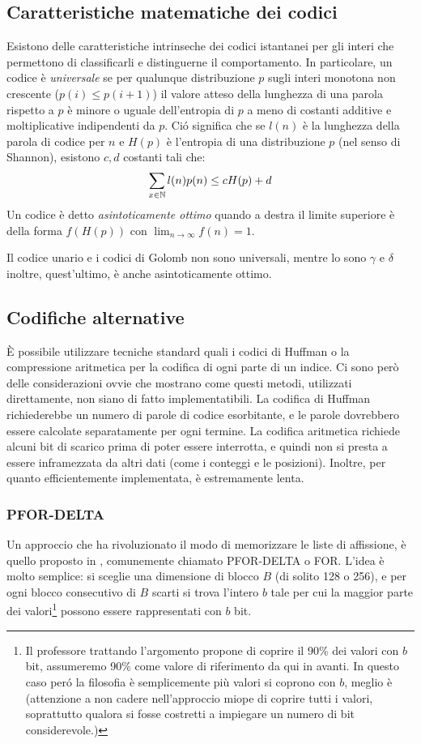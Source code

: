 \subsection{Caratteristiche matematiche dei codici}
Esistono delle caratteristiche intrinseche dei codici istantanei per gli interi che permettono di classificarli e distinguerne il comportamento. In particolare, un codice è \textit{universale} se per qualunque distribuzione $p$ sugli interi monotona non crescente ($p(i) \leq p(i + 1)$) il valore atteso della lunghezza di una parola rispetto a $p$ è minore o uguale dell'entropia di $p$ a meno di costanti additive e moltiplicative indipendenti da $p$. Ció significa che se $l(n)$ è la lunghezza della parola di codice per $n$ e $H(p)$ è l'entropia di una distribuzione $p$ (nel senso di Shannon), esistono $c, d$ costanti tali che:
\begin{equation*}
    \sum_{x \in \mathbb{N}}{l(n)p(n)} \leq cH(p) + d
\end{equation*}
Un codice è detto \textit{asintoticamente ottimo} quando a destra il limite superiore è della forma $f(H(p))$ con $\lim_{n \to \infty} f(n) = 1$.

Il codice unario e i codici di Golomb non sono universali, mentre lo sono $\gamma$ e $\delta$ inoltre, quest'ultimo, è anche asintoticamente ottimo.
\subsection{Codifiche alternative}
È possibile utilizzare tecniche standard quali i codici di Huffman o la compressione aritmetica per la codifica di ogni parte di un indice. Ci sono però delle considerazioni ovvie che mostrano come questi metodi, utilizzati direttamente, non siano di fatto implementatibili. La codifica di Huffman richiederebbe un numero di parole di codice esorbitante, e le parole dovrebbero essere calcolate separatamente per ogni termine. La codifica aritmetica richiede alcuni bit di scarico prima di poter essere interrotta, e quindi non si presta a essere inframezzata da altri dati (come i conteggi e le posizioni). Inoltre, per quanto efficientemente implementata, è estremamente lenta.
\subsubsection{PFOR-DELTA}
Un approccio che ha rivoluzionato il modo di memorizzare le liste di affissione, è quello proposto in \cite{pfordelta}, comunemente chiamato PFOR-DELTA o FOR. L'idea è molto semplice: si sceglie una dimensione di blocco $B$ (di solito 128 o 256), e per ogni blocco consecutivo di $B$ scarti si trova l'intero $b$ tale per cui la maggior parte dei valori\footnote{Il professore trattando l'argomento propone di coprire il 90\% dei valori con $b$ bit, assumeremo 90\% come valore di riferimento da qui in avanti. In questo caso peró la filosofia è semplicemente più valori si coprono con $b$, meglio è (attenzione a non cadere nell'approccio miope di coprire tutti i valori, soprattutto qualora si fosse costretti a impiegare un numero di bit considerevole.)} possono essere rappresentati con $b$ bit.

